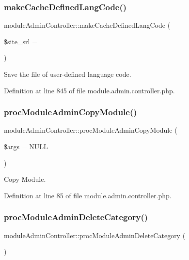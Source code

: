 \subsubsection{\texorpdfstring{make\+Cache\+Defined\+Lang\+Code()}{makeCacheDefinedLangCode()}}
{\footnotesize\ttfamily module\+Admin\+Controller\+::make\+Cache\+Defined\+Lang\+Code (\begin{DoxyParamCaption}\item[{}]{\$site\+\_\+srl = {} }\end{DoxyParamCaption})}



Save the file of user-\/defined language code. 



Definition at line 845 of file module.\+admin.\+controller.\+php.

\hypertarget{classmoduleAdminController_a0540f21334c59ffebd82e08aa24114ab}{}\label{classmoduleAdminController_a0540f21334c59ffebd82e08aa24114ab} 
\subsubsection{\texorpdfstring{proc\+Module\+Admin\+Copy\+Module()}{procModuleAdminCopyModule()}}
{\footnotesize\ttfamily module\+Admin\+Controller\+::proc\+Module\+Admin\+Copy\+Module (\begin{DoxyParamCaption}\item[{}]{\$args = {\ttfamily NULL} }\end{DoxyParamCaption})}



Copy Module. 



Definition at line 85 of file module.\+admin.\+controller.\+php.

\hypertarget{classmoduleAdminController_a49c74e7b6a1ad06aeea82a0f1993b147}{}\label{classmoduleAdminController_a49c74e7b6a1ad06aeea82a0f1993b147} 
\subsubsection{\texorpdfstring{proc\+Module\+Admin\+Delete\+Category()}{procModuleAdminDeleteCategory()}}
{\footnotesize\ttfamily module\+Admin\+Controller\+::proc\+Module\+Admin\+Delete\+Category (\begin{DoxyParamCaption}{ }\end{DoxyParamCaption})}



